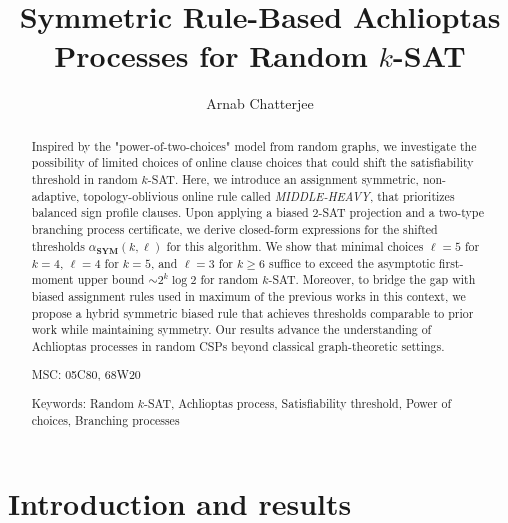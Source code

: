 \documentclass[11pt,reqno]{amsart}
\numberwithin{equation}{section}
\renewcommand{\ln}{\log}
\begin{document}
	
	\title{Symmetric Rule-Based Achlioptas Processes for Random $k$-SAT}
	\author{Arnab Chatterjee}
	
	\address{Arnab Chatterjee, {\tt arnab.chatterjee@tu-dortmund.de}, TU Dortmund, Faculty of Computer Science, 12 Otto-Hahn-St, Dortmund 44227, Germany.}
	
	\maketitle
	
	\begin{abstract}
	Inspired by the "power-of-two-choices" model from random graphs, we investigate the possibility of limited choices of online clause choices that could shift the satisfiability threshold in random $k$-SAT. 
	Here, we introduce an assignment symmetric, non-adaptive, topology-oblivious online rule called \emph{MIDDLE-HEAVY}, that prioritizes balanced sign profile clauses.  
    Upon applying a biased $2$-SAT projection and a two-type branching process certificate, we derive closed-form expressions for the shifted thresholds $\alpha_{\textbf{SYM}}(k,\ell)$ for this algorithm. 
    We show that minimal choices $\ell=5$ for $k=4$, $\ell=4$ for $k=5$, and $\ell=3$ for $k\ge 6$ suffice to exceed the asymptotic first-moment upper bound $\sim 2^k \ln 2$ for random $k$-SAT. 
    Moreover, to bridge the gap with biased assignment rules used in maximum of the previous works in this context, we propose a hybrid symmetric biased rule that achieves thresholds comparable to prior work while maintaining symmetry. 
    Our results advance the understanding of Achlioptas processes in random CSPs beyond classical graph-theoretic settings.
		
		\hfill MSC: 05C80, 68W20
		
		Keywords: Random $k$-SAT, Achlioptas process, Satisfiability threshold, Power of choices, Branching processes
	\end{abstract}
	
	\section{Introduction and results}\label{Sec_not_intro}
	
\end{document}
